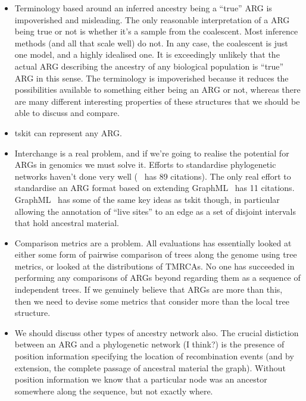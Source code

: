 \documentclass{article}
\begin{document}
\begin{itemize}
\item Terminology based around an inferred ancestry being a ``true''
ARG is impoverished and misleading. The only reasonable interpretation
of a ARG being true or not is whether it's a sample from the coalescent.
Most inference methods (and all that scale well) do not. In any case,
the coalescent is just one model, and a highly idealised one. It is
exceedingly unlikely that the actual ARG describing the ancestry
of any biological population is ``true'' ARG in this sense. The terminology is
impoverished because it reduces the possibilities available
to something either being an ARG or not, whereas there are many different
interesting properties of these structures that we should be able to
discuss and compare.
\item tskit can represent any ARG.
\item Interchange is a real problem, and if we're going to realise the
potential for ARGs in genomics we must solve it. Efforts to standardise
phylogenetic networks haven't done very well (~\citep{cardona2008extended}
has 89 citations). The only real effort to standardise an ARG format
based on extending GraphML~\citep{mcgill2013graphml} has 11 citations.
GraphML~\citep{mcgill2013graphml} has some of the same key ideas
as tskit though, in particular allowing the annotation of ``live sites''
to an edge as a set of disjoint intervals that hold ancestral material.

\item Comparison metrics are a problem. All evaluations has essentially
looked at either some form of pairwise comparison of trees along the genome
using tree metrics, or looked at the distributions of TMRCAs. No
one has succeeded in performing any comparisons of ARGs beyond
regarding them as a sequence of independent trees. If we genuinely believe
that ARGs are more than this, then we need to devise some metrics that
consider more than the local tree structure.

\item We should discuss other types of ancestry network also.
The crucial distiction between an ARG and a phylogenetic network (I think?) is
the presence of position information specifying the location of
recombination events (and by extension, the complete passage
of ancestral material the graph). Without position information
we know that a particular node was an ancestor somewhere along the
sequence, but not exactly where.

\end{itemize}



\end{document}
